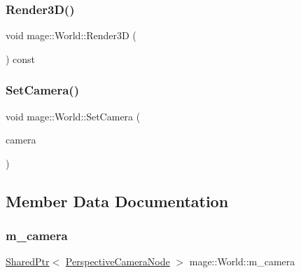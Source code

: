 \hypertarget{classmage_1_1_world_ad58574dabf93d67bad5b492aecc6c209}{}\label{classmage_1_1_world_ad58574dabf93d67bad5b492aecc6c209} 
\subsubsection{\texorpdfstring{Render3\+D()}{Render3D()}}
{\footnotesize\ttfamily void mage\+::\+World\+::\+Render3D (\begin{DoxyParamCaption}{ }\end{DoxyParamCaption}) const}

\hypertarget{classmage_1_1_world_a72ca1a2e9b902d1145b25c8952205829}{}\label{classmage_1_1_world_a72ca1a2e9b902d1145b25c8952205829} 
\subsubsection{\texorpdfstring{Set\+Camera()}{SetCamera()}}
{\footnotesize\ttfamily void mage\+::\+World\+::\+Set\+Camera (\begin{DoxyParamCaption}\item[{\hyperlink{namespacemage_a1e01ae66713838a7a67d30e44c67703e}{Shared\+Ptr}$<$ \hyperlink{namespacemage_a4542f24699be53c2f30040ce575155a7}{Perspective\+Camera\+Node} $>$}]{camera }\end{DoxyParamCaption})}



\subsection{Member Data Documentation}
\hypertarget{classmage_1_1_world_a3c4950e05a425125916345ac95af127d}{}\label{classmage_1_1_world_a3c4950e05a425125916345ac95af127d} 
\subsubsection{\texorpdfstring{m\+\_\+camera}{m\_camera}}
{\footnotesize\ttfamily \hyperlink{namespacemage_a1e01ae66713838a7a67d30e44c67703e}{Shared\+Ptr}$<$ \hyperlink{namespacemage_a4542f24699be53c2f30040ce575155a7}{Perspective\+Camera\+Node} $>$ mage\+::\+World\+::m\+\_\+camera\hspace{0.3cm}{\ttfamily [private]}}

